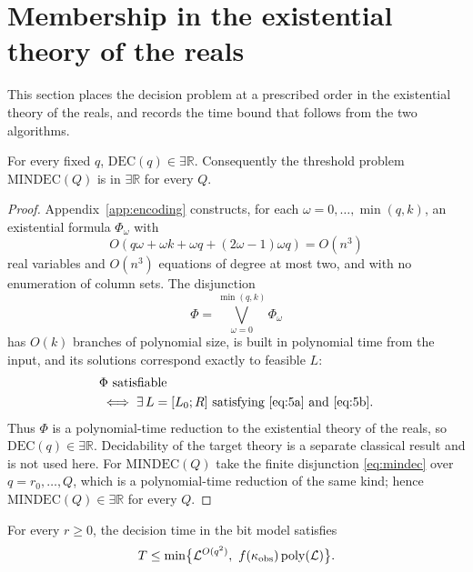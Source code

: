 \section{Membership in the existential theory of the reals}\label{sec:existsr}

This section places the decision problem at a prescribed order in the existential theory of the reals, and records the time bound that follows from the two algorithms.

\begin{thm}\label{thm:existsr}
For every fixed $q$, $\mathrm{DEC}(q)\in\exists\mathbb R$. Consequently the threshold problem $\mathrm{MINDEC}(Q)$ is in $\exists\mathbb R$ for every $Q$.
\end{thm}

\begin{proof}
Appendix~\ref{app:encoding} constructs, for each $\omega=0,\dots,\min(q,k)$, an existential formula $\Phi_\omega$ with
\begin{equation*}
O(q\omega+\omega k+\omega q+(2\omega-1)\omega q)=O(n^3)
\end{equation*}
real variables and $O(n^3)$ equations of degree at most two, and with no enumeration of column sets. The disjunction
\begin{equation}\label{eq:existsr-disj}
\Phi=\bigvee_{\omega=0}^{\min(q,k)}\Phi_\omega
\end{equation}
has $O(k)$ branches of polynomial size, is built in polynomial time from the input, and its solutions correspond exactly to feasible $L$:
\begin{equation*}
\begin{aligned}
&\Phi\ \text{satisfiable}\\
&\iff\exists\,L=[L_0;R]\ \text{satisfying}\ \eqref{eq:5a}\ \text{and}\ \eqref{eq:5b}.
\end{aligned}
\end{equation*}
Thus $\Phi$ is a polynomial-time reduction to the existential theory of the reals, so $\mathrm{DEC}(q)\in\exists\mathbb R$. Decidability of the target theory is a separate classical result and is not used here. For $\mathrm{MINDEC}(Q)$ take the finite disjunction \eqref{eq:mindec} over $q=r_0,\dots,Q$, which is a polynomial-time reduction of the same kind; hence $\mathrm{MINDEC}(Q)\in\exists\mathbb R$ for every $Q$.
\end{proof}

\begin{cor}\label{cor:time}
For every $r\ge0$, the decision time in the bit model satisfies
\begin{equation*}
T\le\min\bigl\{\mathcal L^{O(q^2)},\ f(\kappa_{\rm obs})\operatorname{poly}(\mathcal L)\bigr\}.
\end{equation*}
\end{cor}


